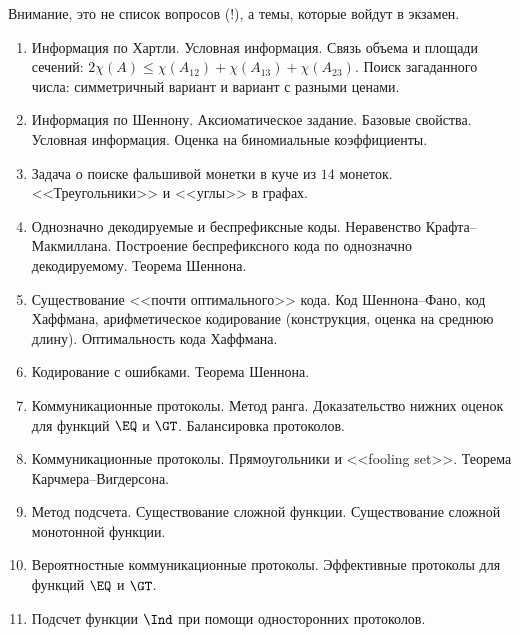 





Внимание, это не список вопросов (!), а темы, которые войдут в экзамен.

\begin{enumerate}
    \item Информация по Хартли. Условная информация. Связь объема и площади сечений: $2 \chi(A) \le
        \chi(A_{12}) + \chi(A_{13}) + \chi(A_{23})$. Поиск загаданного числа: симметричный вариант и
        вариант с разными ценами.
    \item Информация по Шеннону. Аксиоматическое задание. Базовые свойства. Условная информация.
        Оценка на биномиальные коэффициенты.
    \item Задача о поиске фальшивой монетки в куче из $14$ монеток. <<Треугольники>> и <<углы>> в
        графах.
    \item Однозначно декодируемые и беспрефиксные коды. Неравенство Крафта--Макмиллана.
        Построение беспрефиксного кода по однозначно декодируемому. Теорема Шеннона.
    \item Существование <<почти оптимального>> кода. Код Шеннона--Фано, код Хаффмана, арифметическое
        кодирование (конструкция, оценка на среднюю длину). Оптимальность кода Хаффмана.
    \item Кодирование с ошибками. Теорема Шеннона.
    \item Коммуникационные протоколы. Метод ранга. Доказательство нижних оценок для функций $\EQ$ и
        $\GT$. Балансировка протоколов.
    \item Коммуникационные протоколы. Прямоугольники и <<fooling set>>. Теорема Карчмера--Вигдерсона.
    \item Метод подсчета. Существование сложной функции. Существование сложной монотонной функции.
    \item Вероятностные коммуникационные протоколы. Эффективные протоколы для функций $\EQ$ и
        $\GT$.
    \item Подсчет функции $\Ind$ при помощи односторонних протоколов.

\end{enumerate}
